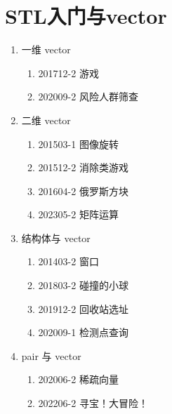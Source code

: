 \documentclass[cn,11pt,chinese]{elegantbook}
\begin{document}
\chapter{STL入门与vector}
\begin{introduction}[本人完成的题目]
  \item 
  \begin{enumerate}[\Roman*]
      \item 一维 vector
   \begin{enumerate}[\arabic*]
       \item 201712-2 游戏
       \item 202009-2 风险人群筛查
   \end{enumerate}
\item 二维 vector
    \begin{enumerate}[\arabic*]
       \item 201503-1 图像旋转
       \item 201512-2 消除类游戏
       \item 201604-2 俄罗斯方块
       \item 202305-2 矩阵运算
   \end{enumerate}
\item 结构体与 vector
    \begin{enumerate}[\arabic*]
      \item 201403-2 窗口
      \item 201803-2 碰撞的小球
      \item 201912-2 回收站选址
      \item 202009-1 检测点查询
   \end{enumerate}
\item pair 与 vector
  \begin{enumerate}[\arabic*]
    \item 202006-2 稀疏向量
    \item 202206-2 寻宝！大冒险！
  \end{enumerate}
  \end{enumerate}
\end{introduction}












\end{document}
